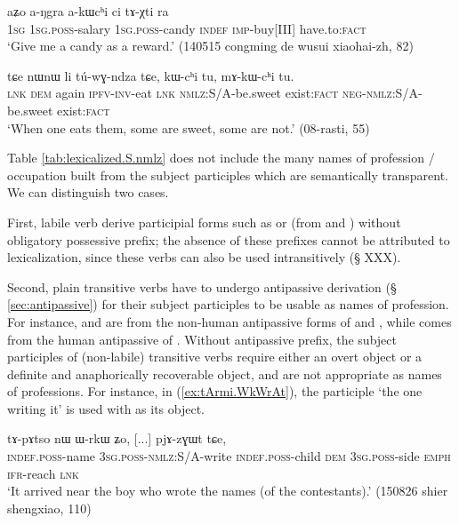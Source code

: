 \begin{exe}
\ex \label{ex:akWchi}
 \gll aʑo a-ŋgra a-kɯcʰi ci tɤ-χti ra \\
 \textsc{1sg} \textsc{1sg}.\textsc{poss}-salary \textsc{1sg}.\textsc{poss}-candy \textsc{indef} \textsc{imp}-buy[III] have.to:\textsc{fact} \\
\glt `Give me a candy as a reward.' (140515 congming de wusui xiaohai-zh, 82)
\end{exe}

\begin{exe}
\ex \label{ex:kWchi.tu}
 \gll tɕe nɯnɯ li tú-wɣ-ndza tɕe, kɯ-cʰi tu, mɤ-kɯ-cʰi tu. \\
\textsc{lnk} \textsc{dem} again \textsc{ipfv}-\textsc{inv}-eat \textsc{lnk} \textsc{nmlz}:S/A-be.sweet exist:\textsc{fact} \textsc{neg}-\textsc{nmlz}:S/A-be.sweet exist:\textsc{fact} \\
\glt `When one eats them, some are sweet, some are not.' (08-rasti, 55)
\end{exe}

Table \ref{tab:lexicalized.S.nmlz} does not include the many names of profession / occupation built from the subject participles which are semantically transparent. We can distinguish two cases. 

First, labile verb derive participial forms such as  or  (from  and ) without obligatory possessive prefix; the absence of these prefixes cannot be attributed to lexicalization, since these verbs can also be used intransitively (§ XXX). 

Second, plain transitive verbs have to undergo antipassive derivation (§ \ref{sec:antipassive}) for their subject participles to be usable as names of profession. For instance,  and  are from the  non-human antipassive forms of  and , while   comes from the  human antipassive of . Without antipassive prefix, the subject participles of (non-labile) transitive verbs require either an overt object or a definite and anaphorically recoverable object, and are not appropriate as names of professions. For instance, in (\ref{ex:tArmi.WkWrAt}), the participle  `the one writing it' is used with  as its object.

\begin{exe}
\ex \label{ex:tArmi.WkWrAt}
  tɤ-pɤtso nɯ ɯ-rkɯ ʑo, [...] pjɤ-zɣɯt tɕe, \\
 \textsc{indef}.\textsc{poss}-name \textsc{3sg}.\textsc{poss}-\textsc{nmlz}:S/A-write  \textsc{indef}.\textsc{poss}-child \textsc{dem} \textsc{3sg}.\textsc{poss}-side \textsc{emph} { } \textsc{ifr}-reach \textsc{lnk} \\
\glt `It arrived near the boy who wrote the names (of the contestants).' (150826 shier shengxiao, 110)
\end{exe}

